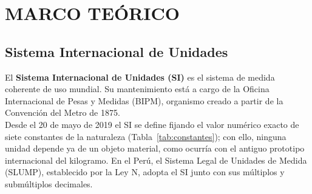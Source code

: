\documentclass[12pt,a4paper]{article}
\begin{document}
\section{MARCO TEÓRICO}

\subsection{Sistema Internacional de Unidades}

El \textbf{Sistema Internacional de Unidades (SI)} es el sistema de medida
coherente de uso mundial. Su mantenimiento está a cargo de la Oficina
Internacional de Pesas y Medidas (BIPM), organismo creado a partir de la
Convención del Metro de 1875.\\[-4pt]

Desde el 20 de mayo de 2019 el SI se define fijando el valor numérico exacto de
siete constantes de la naturaleza (Tabla~\ref{tab:constantes}); con ello,
ninguna unidad depende ya de un objeto material, como ocurría con el antiguo
prototipo internacional del kilogramo. En el Perú, el Sistema Legal de Unidades
de Medida (SLUMP), establecido por la Ley N, adopta el SI junto
con sus múltiplos y submúltiplos decimales.\\[-4pt]
\end{document}
